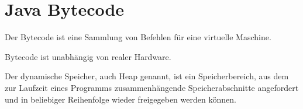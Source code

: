 \chapter{Java Bytecode}
\begin{definition}[Bytecode]%
    Der Bytecode ist eine Sammlung von Befehlen für eine virtuelle Maschine.
\end{definition}

Bytecode ist unabhängig von realer Hardware.

\begin{definition}[Heap]%
    Der dynamische Speicher, auch Heap genannt, ist ein Speicherbereich, aus dem
    zur Laufzeit eines Programms zusammenhängende Speicherabschnitte angefordert
    und in beliebiger Reihenfolge wieder freigegeben werden können.
\end{definition}


